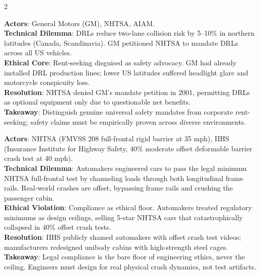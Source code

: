 \documentclass[9pt,a4paper]{extarticle}
\begin{document}
\begin{multicols}{2}
\begin{tcolorbox}[casebox,title={3. GM Daytime Running Lamps (DRLs) (2001)}]
\textbf{Actors}: General Motors (GM), NHTSA, AIAM.\\
\textbf{Technical Dilemma}: DRLs reduce two-lane collision risk by 5--10\% in northern latitudes (Canada, Scandinavia). GM petitioned NHTSA to mandate DRLs across all US vehicles.\\
\textbf{Ethical Core}: Rent-seeking disguised as safety advocacy. GM had already installed DRL production lines; lower US latitudes suffered headlight glare and motorcycle conspicuity loss.\\
\textbf{Resolution}: NHTSA denied GM's mandate petition in 2001, permitting DRLs as optional equipment only due to questionable net benefits.\\
\textbf{Takeaway}: Distinguish genuine universal safety mandates from corporate rent-seeking; safety claims must be empirically proven across diverse environments.
\end{tcolorbox}

\begin{tcolorbox}[casebox,title={4. Automotive Crash Testing: NHTSA vs. IIHS}]
\textbf{Actors}: NHTSA (FMVSS 208 full-frontal rigid barrier at 35 mph), IIHS (Insurance Institute for Highway Safety, 40\% moderate offset deformable barrier crash test at 40 mph).\\
\textbf{Technical Dilemma}: Automakers engineered cars to pass the legal minimum NHTSA full-frontal test by channeling loads through both longitudinal frame rails. Real-world crashes are offset, bypassing frame rails and crushing the passenger cabin.\\
\textbf{Ethical Violation}: Compliance as ethical floor. Automakers treated regulatory minimums as design ceilings, selling 5-star NHTSA cars that catastrophically collapsed in 40\% offset crash tests.\\
\textbf{Resolution}: IIHS publicly shamed automakers with offset crash test videos; manufacturers redesigned unibody cabins with high-strength steel cages.\\
\textbf{Takeaway}: Legal compliance is the bare floor of engineering ethics, never the ceiling. Engineers must design for real physical crash dynamics, not test artifacts.
\end{tcolorbox}


\end{multicols}
\end{document}
